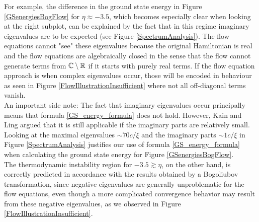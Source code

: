 For example, the difference in the ground state energy in Figure \ref{GSenergiesBogFlow} for $\eta\approx -3.5$, which becomes especially clear when looking at the right subplot, can be explained by the fact that in this regime imaginary eigenvalues are to be expected (see Figure \ref{SpectrumAnalysis}). The flow equations cannot "see" these eigenvalues because the original Hamiltonian is real and the flow equations are algebraically closed in the sense that the flow cannot generate terms from $\mathbb{C}\setminus \mathbb{R}$ if it starts with purely real terms. If the flow equation approach is when complex eigenvalues occur, those will be encoded in behaviour as seen in Figure \ref{FlowIllustrationInsufficient} where not all off-diagonal terms vanish. \\
An important side note: The fact that imaginary eigenvalues occur principally means that formula \ref{GS_energy_formula} does not hold. However, Kain and Ling \cite{PhysRevA.98.033610} argued that it is still applicable if the imaginary parts are relatively small. Looking at the maximal eigenvalues $\sim 70c/\xi$ and the imaginary parts $\sim 1c/\xi$ in Figure \ref{SpectrumAnalysis} justifies our use of formula \ref{GS_energy_formula} when calculating the ground state energy for Figure \ref{GSenergiesBogFlow}.\\
The thermodynamic instability region for $-3.5\gtrsim\eta$, on the other hand, is correctly predicted in accordance with the results obtained by a Bogoliubov transformation, since negative eigenvalues are generally unproblematic for the flow equations, even though a more complicated convergence behavior may result from these negative eigenvalues, as we observed in Figure \ref{FlowIllustrationInsufficient}.

